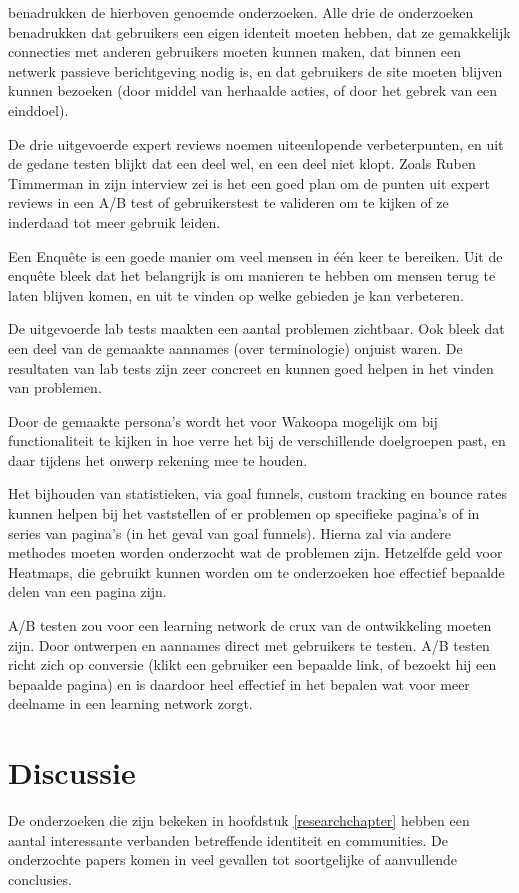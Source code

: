 \documentclass[a4paper, 10pt, pdftex]{report}
\begin{document}
    \citeauthor{Sloep2009} benadrukken de hierboven genoemde onderzoeken. Alle drie de onderzoeken benadrukken dat gebruikers een eigen identeit moeten hebben, dat ze gemakkelijk connecties met anderen gebruikers moeten kunnen maken, dat binnen een netwerk passieve berichtgeving nodig is, en dat gebruikers de site moeten blijven kunnen bezoeken (door middel van herhaalde acties, of door het gebrek van een einddoel).

    De drie uitgevoerde expert reviews noemen uiteenlopende verbeterpunten, en uit de gedane testen blijkt dat een deel wel, en een deel niet klopt. Zoals Ruben Timmerman in zijn interview zei is het een goed plan om de punten uit expert reviews in een A/B test of gebruikerstest te valideren om te kijken of ze inderdaad tot meer gebruik leiden.

    Een Enqu\^ete is een goede manier om veel mensen in \'e\'en keer te bereiken. Uit de enqu\^ete bleek dat het belangrijk is om manieren te hebben om mensen terug te laten blijven komen, en uit te vinden op welke gebieden je kan verbeteren.

    De uitgevoerde lab tests maakten een aantal problemen zichtbaar. Ook bleek dat een deel van de gemaakte aannames (over terminologie) onjuist waren. De resultaten van lab tests zijn zeer concreet en kunnen goed helpen in het vinden van problemen.

    Door de gemaakte persona's wordt het voor Wakoopa mogelijk om bij functionaliteit te kijken in hoe verre het bij de verschillende doelgroepen past, en daar tijdens het onwerp rekening mee te houden.

    Het bijhouden van statistieken, via goal funnels, custom tracking en bounce rates kunnen helpen bij het vaststellen of er problemen op specifieke pagina's of in series van pagina's (in het geval van goal funnels). Hierna zal via andere methodes moeten worden onderzocht wat de problemen zijn. Hetzelfde geld voor Heatmaps, die gebruikt kunnen worden om te onderzoeken hoe effectief bepaalde delen van een pagina zijn.

    A/B testen zou voor een learning network de crux van de ontwikkeling moeten zijn. Door ontwerpen en aannames direct met gebruikers te testen. A/B testen richt zich op conversie (klikt een gebruiker een bepaalde link, of bezoekt hij een bepaalde pagina) en is daardoor heel effectief in het bepalen wat voor meer deelname in een learning network zorgt.

  \newpage
  \chapter*{Discussie}
  De onderzoeken die zijn bekeken in hoofdstuk \ref{researchchapter} hebben een aantal interessante verbanden betreffende identiteit en communities. De onderzochte papers komen in veel gevallen tot soortgelijke of aanvullende conclusies.
\end{document}

